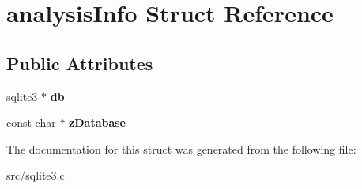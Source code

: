 \hypertarget{structanalysis_info}{\section{analysis\-Info Struct Reference}
\label{structanalysis_info}
}
\subsection*{Public Attributes}
\begin{DoxyCompactItemize}
\item 
\hypertarget{structanalysis_info_a13108eadc55ffe73a8825fb91cc0f9b5}{\hyperlink{structsqlite3}{sqlite3} $\ast$ {\bfseries db}}\label{structanalysis_info_a13108eadc55ffe73a8825fb91cc0f9b5}

\item 
\hypertarget{structanalysis_info_accbe3c1f5613ffa13b9578e58a5d850a}{const char $\ast$ {\bfseries z\-Database}}\label{structanalysis_info_accbe3c1f5613ffa13b9578e58a5d850a}

\end{DoxyCompactItemize}


The documentation for this struct was generated from the following file\-:\begin{DoxyCompactItemize}
\item 
src/sqlite3.\-c\end{DoxyCompactItemize}
